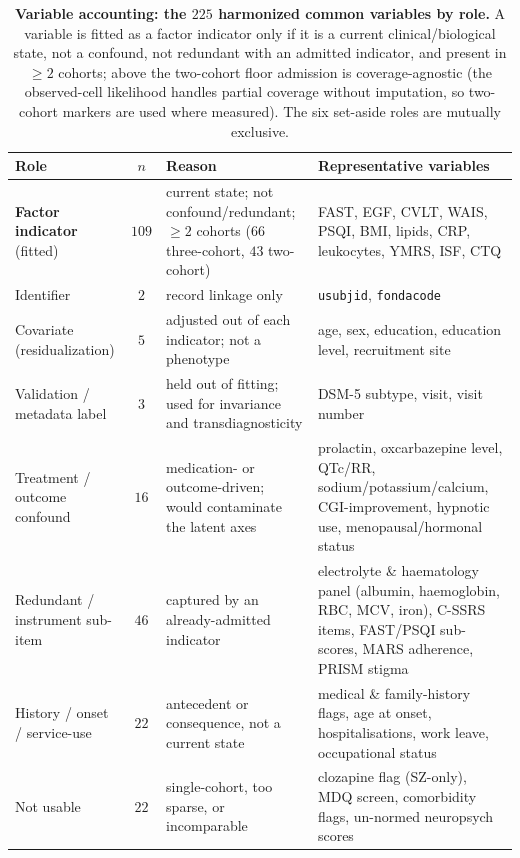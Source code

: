 \begin{table}[t]
\centering
\caption{\textbf{Variable accounting: the $225$ harmonized common variables by role.} A variable
is fitted as a factor indicator only if it is a current clinical/biological state, not a
confound, not redundant with an admitted indicator, and present in $\ge2$ cohorts; above the
two-cohort floor admission is coverage-agnostic (the observed-cell likelihood handles partial
coverage without imputation, so two-cohort markers are used where measured). The six set-aside
roles are mutually exclusive.}
\label{tab:varaccounting}
\small
\renewcommand{\arraystretch}{1.25}
\begin{tabular}{@{}l c >{\raggedright\arraybackslash}p{4.3cm} >{\raggedright\arraybackslash}p{4.6cm}@{}}
\toprule
Role & $n$ & Reason & Representative variables \\
\midrule
\textbf{Factor indicator} (fitted) & $109$ & current state; not confound/redundant; $\ge2$ cohorts ($66$ three-cohort, $43$ two-cohort) & FAST, EGF, CVLT, WAIS, PSQI, BMI, lipids, CRP, leukocytes, YMRS, ISF, CTQ \\
\midrule
Identifier & $2$ & record linkage only & \texttt{usubjid}, \texttt{fondacode} \\
Covariate (residualization) & $5$ & adjusted out of each indicator; not a phenotype & age, sex, education, education level, recruitment site \\
Validation / metadata label & $3$ & held out of fitting; used for invariance and transdiagnosticity & DSM-5 subtype, visit, visit number \\
Treatment / outcome confound & $16$ & medication- or outcome-driven; would contaminate the latent axes & prolactin, oxcarbazepine level, QTc/RR, sodium/potassium/calcium, CGI-improvement, hypnotic use, menopausal/hormonal status \\
Redundant / instrument sub-item & $46$ & captured by an already-admitted indicator & electrolyte \& haematology panel (albumin, haemoglobin, RBC, MCV, iron), C-SSRS items, FAST/PSQI sub-scores, MARS adherence, PRISM stigma \\
History / onset / service-use & $22$ & antecedent or consequence, not a current state & medical \& family-history flags, age at onset, hospitalisations, work leave, occupational status \\
Not usable & $22$ & single-cohort, too sparse, or incomparable & clozapine flag (SZ-only), MDQ screen, comorbidity flags, un-normed neuropsych scores \\
\bottomrule
\end{tabular}
\end{table}

